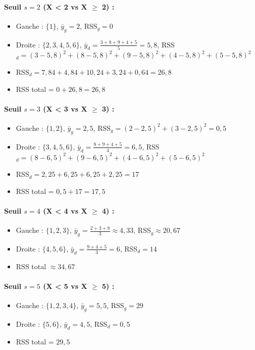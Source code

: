 \documentclass[a4paper,11pt]{article}
\begin{document}
\paragraph{Seuil $s = 2$ (X < 2 vs X $\ge$ 2) :}
\begin{itemize}
    \item Gauche : $\{1\}$, $\bar{y}_g = 2$, RSS$_g = 0$
    \item Droite : $\{2,3,4,5,6\}$, $\bar{y}_d = \frac{3+8+9+4+5}{5} = 5{,}8$, RSS$_d = (3-5{,}8)^2 + (8-5{,}8)^2 + (9-5{,}8)^2 + (4-5{,}8)^2 + (5-5{,}8)^2$
    \item RSS$_d = 7{,}84 + 4{,}84 + 10{,}24 + 3{,}24 + 0{,}64 = 26{,}8$
    \item RSS total = $0 + 26{,}8 = 26{,}8$
\end{itemize}

\paragraph{Seuil $s = 3$ (X < 3 vs X $\ge$ 3) :}
\begin{itemize}
    \item Gauche : $\{1,2\}$, $\bar{y}_g = 2{,}5$, RSS$_g = (2-2{,}5)^2 + (3-2{,}5)^2 = 0{,}5$
    \item Droite : $\{3,4,5,6\}$, $\bar{y}_d = \frac{8+9+4+5}{4} = 6{,}5$, RSS$_d = (8-6{,}5)^2 + (9-6{,}5)^2 + (4-6{,}5)^2 + (5-6{,}5)^2$
    \item RSS$_d = 2{,}25 + 6{,}25 + 6{,}25 + 2{,}25 = 17$
    \item RSS total = $0{,}5 + 17 = 17{,}5$
\end{itemize}

\paragraph{Seuil $s = 4$ (X < 4 vs X $\ge$ 4) :}
\begin{itemize}
    \item Gauche : $\{1,2,3\}$, $\bar{y}_g = \frac{2+3+8}{3} \approx 4{,}33$, RSS$_g \approx 20{,}67$
    \item Droite : $\{4,5,6\}$, $\bar{y}_d = \frac{9+4+5}{3} = 6$, RSS$_d = 14$
    \item RSS total $\approx 34{,}67$
\end{itemize}

\paragraph{Seuil $s = 5$ (X < 5 vs X $\ge$ 5) :}
\begin{itemize}
    \item Gauche : $\{1,2,3,4\}$, $\bar{y}_g = 5{,}5$, RSS$_g = 29$
    \item Droite : $\{5,6\}$, $\bar{y}_d = 4{,}5$, RSS$_d = 0{,}5$
    \item RSS total = $29{,}5$
\end{itemize}
\end{document}
